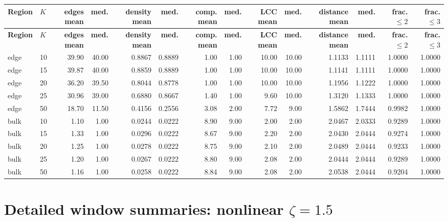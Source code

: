 \documentclass[10pt,letterpaper]{article}
\newcommand{\Hdr}[1]{\cellcolor{navy}\color{white}\bfseries #1}
\begin{document}
\scriptsize
{}\begin{longtable}{|l|l|r|r|r|r|r|r|r|r|r|r|r|r|}\hline
\Hdr{Region} & \Hdr{$K$} & \Hdr{edges mean} & \Hdr{med.} & \Hdr{density mean} & \Hdr{med.} & \Hdr{comp. mean} & \Hdr{med.} & \Hdr{LCC mean} & \Hdr{med.} & \Hdr{distance mean} & \Hdr{med.} & \Hdr{frac. $\le2$} & \Hdr{frac. $\le3$}\\\hline\endfirsthead
\hline \Hdr{Region} & \Hdr{$K$} & \Hdr{edges mean} & \Hdr{med.} & \Hdr{density mean} & \Hdr{med.} & \Hdr{comp. mean} & \Hdr{med.} & \Hdr{LCC mean} & \Hdr{med.} & \Hdr{distance mean} & \Hdr{med.} & \Hdr{frac. $\le2$} & \Hdr{frac. $\le3$}\\\hline\endhead
edge & 10 & 39.90 & 40.00 & 0.8867 & 0.8889 & 1.00 & 1.00 & 10.00 & 10.00 & 1.1133 & 1.1111 & 1.0000 & 1.0000 \\\hline
edge & 15 & 39.87 & 40.00 & 0.8859 & 0.8889 & 1.00 & 1.00 & 10.00 & 10.00 & 1.1141 & 1.1111 & 1.0000 & 1.0000 \\\hline
edge & 20 & 36.20 & 39.50 & 0.8044 & 0.8778 & 1.00 & 1.00 & 10.00 & 10.00 & 1.1956 & 1.1222 & 1.0000 & 1.0000 \\\hline
edge & 25 & 30.96 & 39.00 & 0.6880 & 0.8667 & 1.40 & 1.00 & 9.60 & 10.00 & 1.3120 & 1.1333 & 1.0000 & 1.0000 \\\hline
edge & 50 & 18.70 & 11.50 & 0.4156 & 0.2556 & 3.08 & 2.00 & 7.72 & 9.00 & 1.5862 & 1.7444 & 0.9982 & 1.0000 \\\hline
\hline
bulk & 10 & 1.10 & 1.00 & 0.0244 & 0.0222 & 8.90 & 9.00 & 2.00 & 2.00 & 2.0467 & 2.0333 & 0.9289 & 1.0000 \\\hline
bulk & 15 & 1.33 & 1.00 & 0.0296 & 0.0222 & 8.67 & 9.00 & 2.20 & 2.00 & 2.0430 & 2.0444 & 0.9274 & 1.0000 \\\hline
bulk & 20 & 1.25 & 1.00 & 0.0278 & 0.0222 & 8.75 & 9.00 & 2.10 & 2.00 & 2.0489 & 2.0444 & 0.9233 & 1.0000 \\\hline
bulk & 25 & 1.20 & 1.00 & 0.0267 & 0.0222 & 8.80 & 9.00 & 2.08 & 2.00 & 2.0444 & 2.0444 & 0.9289 & 1.0000 \\\hline
bulk & 50 & 1.16 & 1.00 & 0.0258 & 0.0222 & 8.84 & 9.00 & 2.08 & 2.00 & 2.0538 & 2.0444 & 0.9204 & 1.0000 \\\hline
\hline
\hline\end{longtable}
\endgroup
\begingroup
\section{Detailed window summaries: nonlinear $\zeta=1.5$}
\end{document}
